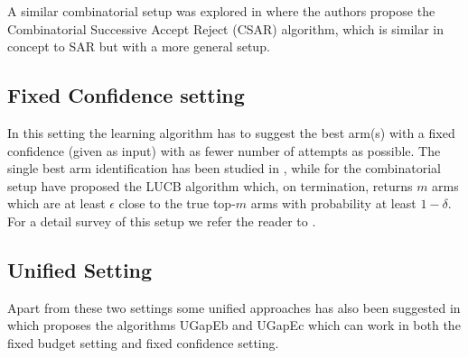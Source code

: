 	A similar combinatorial setup was explored in \citet{chen2014combinatorial} where the authors propose the Combinatorial Successive Accept Reject (CSAR) algorithm, which is similar in concept to SAR but with a more general setup. 

 
\subsection{Fixed Confidence setting} 

In this setting the learning algorithm has to suggest the best arm(s) with a fixed confidence (given as input) with as fewer number of attempts as possible. The single best arm identification has been studied in \citet{even2006action}, while for the combinatorial setup \citet{kalyanakrishnan2012pac} have proposed the LUCB algorithm which, on termination, returns  $m$ arms which are at least $\epsilon$ close to the true top-$m$ arms with probability at least $1-\delta$. For a detail survey of this setup we refer the reader to \citet{jamieson2014best}. 

\subsection{Unified Setting}
Apart from these two settings some unified approaches has also been suggested in \citet{gabillon2012best} which proposes the algorithms UGapEb and UGapEc which can work in both the fixed budget setting and fixed confidence  setting. 



	
	
